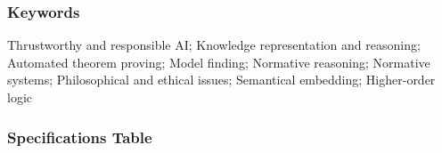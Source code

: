 \documentclass{article}
\newcommand{\comment}[1]{
}
\begin{document}
\comment{
[The Abstract should describe the data collection process, the analysis performed, the data, and their reuse potential. It should not provide conclusions or interpretive insights. If your article is being submitted via another Elsevier journal as a co-submission, please cite this research article in the abstract (title, or doi, and reference number only, e.g. “Title” [1]), and point the reader there for interpretation. \\
Min 100 words - Max 500 words] 
}



\subsubsection*{Keywords}
Thrustworthy and responsible AI; Knowledge representation and
reasoning; Automated theorem proving; Model finding; Normative
reasoning; Normative systems; Philosophical and ethical issues;
Semantical embedding; Higher-order logic

\comment{
[Include 4-8 keywords (or phrases) to facilitate others finding your article online. Tip: Try Google Scholar to see what terms are most common in your field. In biomedical fields, MeSH terms are a good ‘common vocabulary’ to draw from]
}



\subsubsection*{Specifications Table} 

\comment{
[Every section of this table is mandatory. Please enter information in the right-hand column and remove all the instructions]
}
\end{document}
